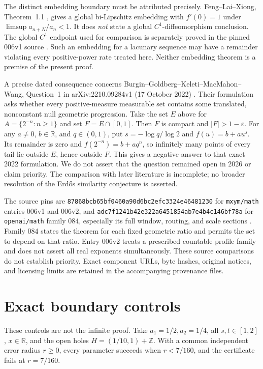 \documentclass[11pt,letterpaper]{article}
\newcommand{\R}{\mathbb R}
\newcommand{\Z}{\mathbb Z}
\begin{document}
The distinct embedding boundary must be attributed precisely.
Feng--Lai--Xiong, Theorem~1.1 \cite{FLX}, gives a global bi-Lipschitz embedding
with $f'(0)=1$ under $\limsup a_{n+N}/a_n<1$. It does \emph{not} state a global
$C^1$-diffeomorphism conclusion. The global $C^1$ endpoint used for comparison
is separately proved in the pinned 006v1 source \cite{M006}. Such an embedding
for a lacunary sequence may have a remainder violating every positive-power
rate treated here. Neither embedding theorem is a premise of the present proof.

A precise dated consequence concerns Burgin--Goldberg--Keleti--MacMahon--Wang,
Question~1 in arXiv:2210.09284v1 (17 October 2022) \cite{BGKMW}. Their
formulation asks whether every positive-measure measurable set contains some
translated, nonconstant null geometric progression. Take the set $E$ above
for $A=\{2^{-n}:n\ge1\}$ and set $F=E\cap[0,1]$. Then $F$ is compact and
$|F|>1-\varepsilon$. For any $a\ne0$, $b\in\R$, and $q\in(0,1)$, put
$s=-\log q/\log2$ and $f(u)=b+au^s$. Its remainder is zero and
$f(2^{-n})=b+aq^n$, so infinitely many points of every tail lie outside $E$,
hence outside $F$. This gives a negative answer to that exact 2022 formulation.
We do not assert that the question remained open in 2026 or claim priority.
The comparison with later literature is incomplete; no broader resolution of
the Erd\H{o}s similarity conjecture is asserted.

The source pins are \texttt{87868bcb65bf0460a90d6bc2efc3324e46481230} for
\texttt{mxym/math} entries 006v1 and 006v2, and
\texttt{adc7f1241b42e322a6451854ab7e4b4c146bf78a} for
\texttt{openai/math} family 084, especially its full window, routing, and scale
sections \cite{O084}. Family 084 states the theorem for each fixed geometric
ratio and permits the set to depend on that ratio. Entry 006v2 treats a
prescribed countable profile family and does not assert all real exponents
simultaneously. These source comparisons do not establish priority.
Exact component URLs, byte hashes, original notices, and licensing limits are
retained in the accompanying provenance files.

\section{Exact boundary controls}
These controls are not the infinite proof. Take $a_1=1/2,a_2=1/4$, all
$s,t\in[1,2]$, $x\in\R$, and the open holes $H=(1/10,1)+\Z$. With a common
independent error radius $r\ge0$, every parameter succeeds when $r<7/160$,
and the certificate fails at $r=7/160$.
\end{document}

